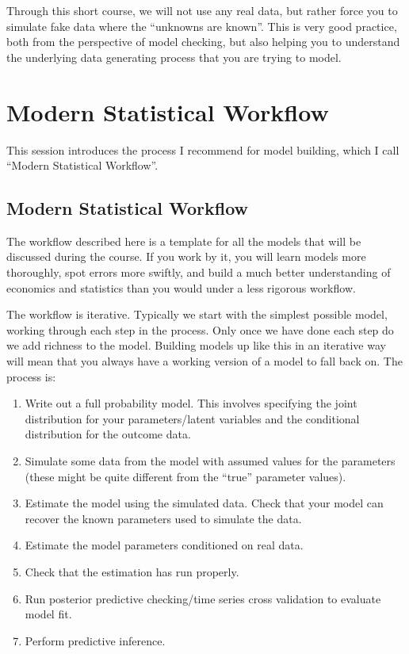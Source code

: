 \documentclass[]{book}
\providecommand{\tightlist}{%
  \setlength{\itemsep}{0pt}\setlength{\parskip}{0pt}}
\begin{document}
Through this short course, we will not use any real data, but rather
force you to simulate fake data where the ``unknowns are known''. This
is very good practice, both from the perspective of model checking, but
also helping you to understand the underlying data generating process
that you are trying to model.

\chapter{Modern Statistical Workflow}\label{intro}

This session introduces the process I recommend for model building,
which I call ``Modern Statistical Workflow''.

\section{Modern Statistical Workflow}\label{modern-statistical-workflow}

The workflow described here is a template for all the models that will
be discussed during the course. If you work by it, you will learn models
more thoroughly, spot errors more swiftly, and build a much better
understanding of economics and statistics than you would under a less
rigorous workflow.

The workflow is iterative. Typically we start with the simplest possible
model, working through each step in the process. Only once we have done
each step do we add richness to the model. Building models up like this
in an iterative way will mean that you always have a working version of
a model to fall back on. The process is:

\begin{enumerate}
\def\labelenumi{\arabic{enumi}.}
\tightlist
\item
  Write out a full probability model. This involves specifying the joint
  distribution for your parameters/latent variables and the conditional
  distribution for the outcome data.
\item
  Simulate some data from the model with assumed values for the
  parameters (these might be quite different from the ``true'' parameter
  values).
\item
  Estimate the model using the simulated data. Check that your model can
  recover the known parameters used to simulate the data.
\item
  Estimate the model parameters conditioned on real data.
\item
  Check that the estimation has run properly.
\item
  Run posterior predictive checking/time series cross validation to
  evaluate model fit.
\item
  Perform predictive inference.
\end{enumerate}
\end{document}
